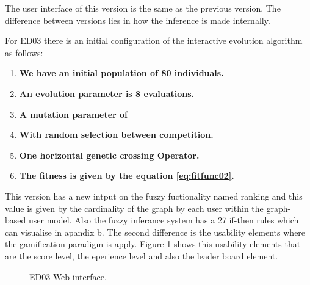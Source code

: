 The user interface of this version is the same as the previous version. The difference between versions lies in how the inference is made internally.

For ED03 there is an initial configuration of the interactive evolution algorithm as follows:

\begin{enumerate}
	\item  \textbf{We have an initial population of 80 individuals.}

	\item  \textbf{An evolution parameter is 8 evaluations.}

	\item  \textbf{A mutation parameter of }
	\item  \textbf{With random selection between competition.}
	\item  \textbf{One horizontal genetic crossing Operator.}
	\item  \textbf{The fitness is given by the equation \ref{eq:fitfunc02}.}
\end{enumerate}

This version has a new intput on the fuzzy fuctionality named ranking and this
value is given by the cardinality of the graph by each user within the graph-
based user model. Also the fuzzy inferance system has a 27 if-then rules which
can visualise in apandix b. The second difference is the usability elements
where the gamification paradigm is apply. Figure \ref{fig:intarface03} shows this
usability elements that are the score level, the eperience level and also the
leader board element.

\begin{figure}
\captionsetup{justification=centering,margin=2cm}
\centering
\setlength\fboxsep{0pt}
\setlength\fboxrule{0.7pt}
\caption{ED03 Web interface.}
\label{fig:intarface03}
\end{figure}

